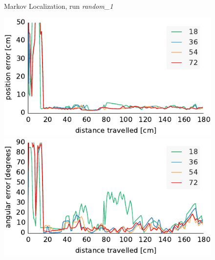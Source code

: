 \documentclass[letterpaper, 10pt, conference]{ieeeconf}
\begin{document}
\begin{figure}

\begin{center}
Markov Localization, run \emph{random\_1}
\end{center}
\includegraphics{ml-whole_random_1-xy}\hfill
\includegraphics{ml-whole_random_1-theta}

\vspace{.5em}


\end{figure}
\end{document}
